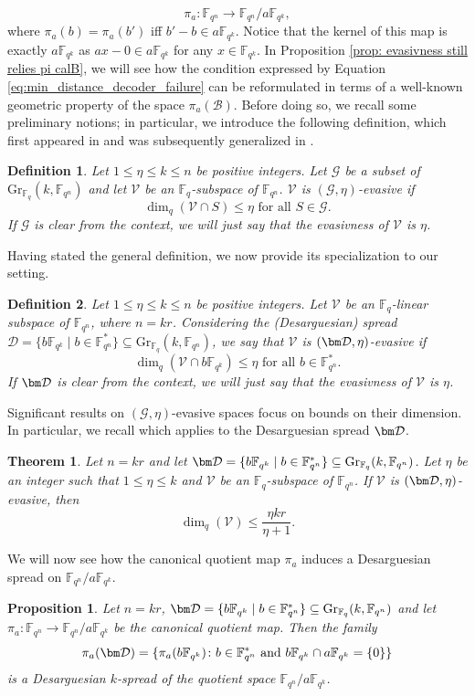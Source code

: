 \documentclass{article}
\newtheorem{theorem}{Theorem}
\newtheorem{proposition}{Proposition}
\newtheorem{definition}{Definition}
\newcommand{\F}{\mathbb{F}}
\newcommand{\Fq}{\mathbb{F}_{q}}
\newcommand{\Fqn}{\mathbb{F}_{q^n}}
\newcommand{\Fqk}{\mathbb{F}_{q^k}}
\newcommand{\calB}{\mathcal{B}}
\newcommand{\calD}{\mathcal{D}}
\newcommand{\calG}{\mathcal{G}}
\newcommand{\calV}{\mathcal{V}}
\begin{document}
\begin{equation*}
\pi_a\colon\Fqn \to\Fqn/a\Fqk,
\end{equation*}
where $\pi_a(b) = \pi_a(b')$ iff $b' - b \in a \Fqk$.  
Notice that the kernel of this map is exactly $a \Fqk$ as $ax - 0 \in a \Fqk$ for any $x \in \Fqk$.
In Proposition \ref{prop: evasivness still relies pi calB}, we will see how the condition expressed by Equation \eqref{eq:min_distance_decoder_failure} can be reformulated in terms of a well-known geometric property of the space $\pi_a(\calB)$. Before doing so, we recall some preliminary notions; in particular, we introduce the following definition, which first appeared in \cite{blokhuis2000scattered} and was subsequently generalized in \cite[Definition 2.2]{gruica2024generalised}.
\begin{definition}
    Let $1\leq \eta\leq k\leq n$ be positive integers. Let $\calG$ be a subset of $\mathrm{Gr}_{\Fq}(k,\F_{q^n})$ and let $\calV$ be an $\Fq$-subspace of $\F_{q^n}$. $\calV$ is $(\calG,\eta)$-evasive if
    \[
    \dim_q(\calV\cap S)\leq \eta\text{ for all }S\in\calG.
    \]
If $\calG$ is clear from the context, we will just say that the evasivness of $\calV$ is $\eta$.
\end{definition}
Having stated the general definition, we now provide its specialization to our setting.
\begin{definition}
\label{def: evasivness of V}
Let $1\leq\eta\leq k\leq n$ be positive integers. Let $\calV$ be an $\Fq$-linear subspace of $\Fqn$, where $n = kr$.
Considering the (Desarguesian) spread $\bm{\mathcal{D}}
= \{ b \Fqk \mid b \in \Fqn^* \} \subseteq \mathrm{Gr}_{\Fq}(k,\Fqn)$, we say that $\calV$ is $(\bm \calD,\eta)$-evasive if 
$$
    \dim_q(\calV \cap b \Fqk) \leq \eta \text{ for all }b \in \Fqn^*.
$$
If $\bm \calD$ is clear from the context, we will just say that the evasivness of $\calV$ is $\eta$. 
\end{definition}
Significant results on $(\mathcal{G},\eta)$-evasive spaces focus on bounds on their dimension. In particular, we recall \cite[Corollary 4.9]{bartoli2021evasive} which applies to the Desarguesian spread $\bm \calD $.
\begin{theorem}
    \label{ref: bound on the dimnesion of an evasive subspace with respect to a esarguesian spread}
    Let $n=kr$ and let $\bm \calD = \{ b \Fqk \mid b \in \Fqn^* \} \subseteq \mathrm{Gr}_{\Fq}(k,\Fqn)$. Let $\eta$ be an integer such that $1\leq \eta\leq k$ and $\calV$ be an $\Fq$-subspace of $\Fqn$. If $\calV$ is $(\bm \calD,\eta)$-evasive, then
    \[
    \dim_q(\calV)\leq \frac{\eta kr}{\eta+1}.
    \]
\end{theorem}
We will now see how the canonical quotient map $\pi_a$ induces a Desarguesian spread on $\Fqn/a\Fqk$. 
\begin{proposition}
\label{prop: pi is also a spread}
Let $n=kr$, $\bm \calD = \{ b \Fqk \mid b \in \Fqn^* \} \subseteq \mathrm{Gr}_{\Fq}(k,\Fqn)$ and let $\pi_a\colon\Fqn\to\Fqn/a\Fqk$ be the canonical quotient map. Then the family
\[
\pi_a(\bm\calD)
=
\{\pi_a(b\Fqk)\colon  b\in\Fqn^*\text{ and }b\Fqk\cap a\Fqk=\{0\}\}
\]
is a Desarguesian $k$-spread of the quotient space $\Fqn/a\Fqk$. 
\end{proposition}
\end{document}
